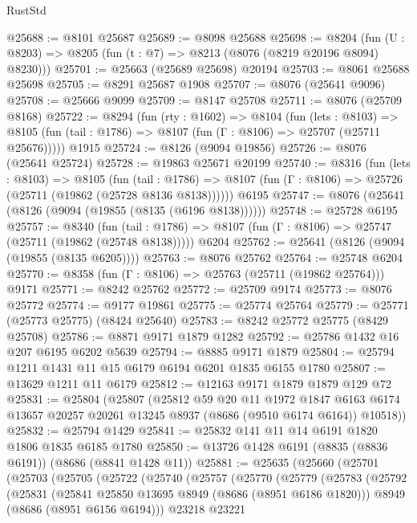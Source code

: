 \begin{lexlean}{RustStd}
\begin{coremodule}
@25688 := @8101 @25687
@25689 := @8098 @25688
@25698 := @8204
    (fun (U : @8203) => @8205 (fun (t : @7) => @8213 (@8076 (@8219 @20196 @8094) @8230)))
@25701 := @25663 (@25689 @25698) @20194
@25703 := @8061 @25688 @25698
@25705 := @8291 @25687 @1908
@25707 := @8076 (@25641 @9096)
@25708 := @25666 @9099
@25709 := @8147 @25708
@25711 := @8076 (@25709 @8168)
@25722 := @8294
    (fun (rty : @1602) =>
    @8104
      (fun (lets : @8103) =>
      @8105 (fun (tail : @1786) => @8107 (fun (Γ : @8106) => @25707 (@25711 @25676)))))
    @1915
@25724 := @8126 (@9094 @19856)
@25726 := @8076 (@25641 @25724)
@25728 := @19863 @25671 @20199
@25740 := @8316
    (fun (lets : @8103) =>
    @8105
      (fun (tail : @1786) =>
      @8107 (fun (Γ : @8106) => @25726 (@25711 (@19862 (@25728 @8136 @8138))))))
    @6195
@25747 := @8076 (@25641 (@8126 (@9094 (@19855 (@8135 (@6196 @8138))))))
@25748 := @25728 @6195
@25757 := @8340
    (fun (tail : @1786) => @8107 (fun (Γ : @8106) => @25747 (@25711 (@19862 (@25748 @8138)))))
    @6204
@25762 := @25641 (@8126 (@9094 (@19855 (@8135 @6205))))
@25763 := @8076 @25762
@25764 := @25748 @6204
@25770 := @8358 (fun (Γ : @8106) => @25763 (@25711 (@19862 @25764))) @9171
@25771 := @8242 @25762
@25772 := @25709 @9174
@25773 := @8076 @25772
@25774 := @9177 @19861
@25775 := @25774 @25764
@25779 := @25771 (@25773 @25775) (@8424 @25640)
@25783 := @8242 @25772 @25775 (@8429 @25708)
@25786 := @8871 @9171 @1879 @1282
@25792 := @25786 @1432 @16 @207 @6195 @6202 @5639
@25794 := @8885 @9171 @1879
@25804 := @25794 @1211 @1431 @11 @15 @6179 @6194 @6201 @1835 @6155 @1780
@25807 := @13629 @1211 @11 @6179
@25812 := @12163 @9171 @1879 @1879 @129 @72
@25831 := @25804
    (@25807
      (@25812
        @59
        @20
        @11
        @1972
        @1847
        @6163
        @6174
        @13657
        @20257
        @20261
        @13245
        @8937
        (@8686 (@9510 @6174 @6164))
        @10518))
@25832 := @25794 @1429
@25841 := @25832 @141 @11 @14 @6191 @1820 @1806 @1835 @6185 @1780
@25850 := @13726 @1428 @6191 (@8835 (@8836 @6191)) (@8686 (@8841 @1428 @11))
@25881 := @25635
    (@25660
      (@25701
        (@25703
          (@25705
            (@25722
              (@25740
                (@25757
                  (@25770
                    (@25779
                      (@25783
                        (@25792
                          (@25831
                            (@25841 @25850 @13695 @8949 (@8686 (@8951 @6186 @1820)))
                            @8949
                            (@8686 (@8951 @6156 @6194)))
                          @23218
                          @23221

\end{coremodule}
\end{lexlean}
